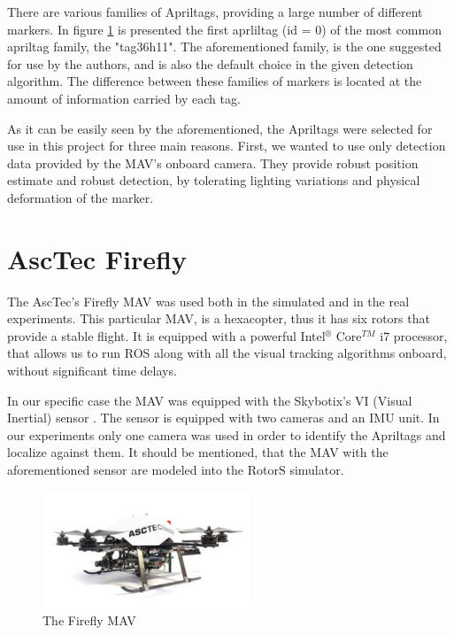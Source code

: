 There are various families of Apriltags, providing a large number of different markers. In figure \ref{pics:tag36h11} is presented the first aprliltag (id = 0) of the most common apriltag family, the "tag36h11". The aforementioned family, is the one suggested for use by the authors, and is also the default choice in the given detection algorithm. The difference between these families of markers is located at the amount of information carried by each tag.

As it can be easily seen by the aforementioned, the Apriltags were selected for use in this project for three main reasons. First, we wanted to use only detection data provided by the MAV's onboard camera. They provide robust position estimate and robust detection, by tolerating lighting variations and physical deformation of the marker. 


\section{AscTec Firefly}
\label{sec:ascTecFirefly}

The AscTec's Firefly MAV was used both in the simulated and in the real experiments. This particular MAV, is a hexacopter, thus it has six rotors that provide a stable flight. It is equipped with a powerful Intel$^{\circledR}$ Core$^{TM}$ i7 processor, that allows us to run ROS along with all the visual tracking algorithms onboard, without significant time delays.

In our specific case the MAV was equipped with the Skybotix's VI (Visual Inertial) sensor \cite{Nklc2014}. The sensor is equipped with two cameras and an IMU unit. In our experiments only one camera was used in order to identify the Apriltags and localize against them. It should be mentioned, that the MAV with the aforementioned sensor are modeled into the RotorS simulator.

\begin{figure}
   \centering
   \includegraphics[width=0.55\textwidth]{images/AscTecFirefly.pdf}
   \caption{The Firefly MAV\protect\footnotemark}
   \label{pics:tag36h11}
\end{figure}
 

